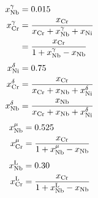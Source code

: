 \documentclass[10pt]{article}
\begin{document}
		\begin{align*}
			x_{\ce{Nb}}^{\gamma} &= 0.015\\
			x_{\ce{Cr}}^{\gamma} &= \frac{x_{\ce{Cr}}}{x_{\ce{Cr}} + x_{\ce{Nb}}^{\gamma} + x_{\ce{Ni}}}\\
			                                      &= \frac{x_{\ce{Cr}}}{1 + x_{\ce{Nb}}^{\gamma} - x_{\ce{Nb}}} 
		\end{align*}
		\begin{align*}
			x_{\ce{Ni}}^{\delta} &= 0.75\\
			x_{\ce{Cr}}^{\delta} &= \frac{x_{\ce{Cr}}}{x_{\ce{Cr}} + x_{\ce{Nb}} + x_{\ce{Ni}}^{\delta}}\\
			x_{\ce{Nb}}^{\delta} &= \frac{x_{\ce{Nb}}}{x_{\ce{Cr}} + x_{\ce{Nb}} + x_{\ce{Ni}}^{\delta}}
		\end{align*}
		\begin{align*}
			x_{\ce{Nb}}^{\mu}    &= 0.525\\
			x_{\ce{Cr}}^{\mu}    &= \frac{x_{\ce{Cr}}}{1 + x_{\ce{Nb}}^{\mu} - x_{\ce{Nb}}}
		\end{align*}
		\begin{align*}
			x_{\ce{Nb}}^{\ce{L}} &= 0.30\\
			x_{\ce{Cr}}^{\ce{L}} &= \frac{x_{\ce{Cr}}}{1 + x_{\ce{Nb}}^{\ce{L}} - x_{\ce{Nb}}}
		\end{align*}
\end{document}
